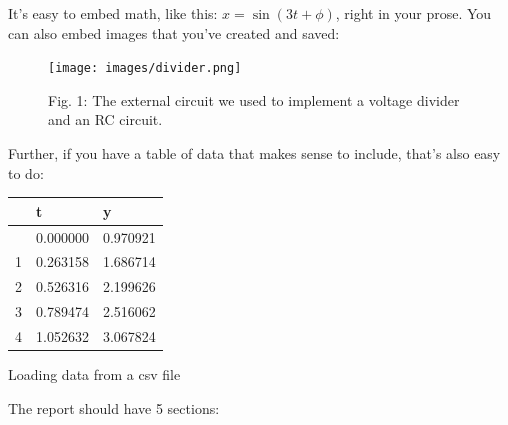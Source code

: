 \documentclass[
  letterpaper,
  DIV=11,
  numbers=noendperiod]{scrartcl}
\begin{document}
It's easy to embed math, like this: \(x=\sin(3t + \phi)\), right in your
prose. You can also embed images that you've created and saved:

\begin{figure}[H]

{\centering \texttt{[image: images/divider.png]}

}

\caption{Fig. 1: The external circuit we used to implement a voltage
divider and an RC circuit.}

\end{figure}%

Further, if you have a table of data that makes sense to include, that's
also easy to do:

\label{read_data}
\begin{longtable}[]{@{}lll@{}}
\toprule\noalign{}
& t & y \\
\midrule\noalign{}
\endhead
\bottomrule\noalign{}
\endlastfoot
0 & 0.000000 & 0.970921 \\
1 & 0.263158 & 1.686714 \\
2 & 0.526316 & 2.199626 \\
3 & 0.789474 & 2.516062 \\
4 & 1.052632 & 3.067824 \\
\end{longtable}

Loading data from a csv file

The report should have 5 sections:
\end{document}
